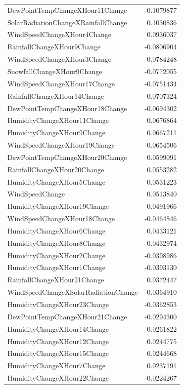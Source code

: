 \documentclass[
  letterpaper,
  DIV=11,
  numbers=noendperiod]{scrartcl}
\begin{document}
\begin{longtable}[]{@{}lr@{}}
DewPointTempChangeXHour11Change & -0.1079877 \\
SolarRadiationChangeXRainfallChange & 0.1030836 \\
WindSpeedChangeXHour4Change & 0.0936037 \\
RainfallChangeXHour9Change & -0.0806904 \\
WindSpeedChangeXHour3Change & 0.0784248 \\
SnowfallChangeXHour9Change & -0.0772055 \\
WindSpeedChangeXHour17Change & -0.0751434 \\
RainfallChangeXHour14Change & 0.0707324 \\
DewPointTempChangeXHour18Change & -0.0694302 \\
HumidityChangeXHour11Change & 0.0676864 \\
HumidityChangeXHour9Change & 0.0667211 \\
WindSpeedChangeXHour19Change & -0.0654506 \\
DewPointTempChangeXHour20Change & 0.0599091 \\
RainfallChangeXHour20Change & 0.0553282 \\
HumidityChangeXHour5Change & 0.0531223 \\
WindSpeedChange & 0.0513840 \\
HumidityChangeXHour19Change & 0.0491966 \\
WindSpeedChangeXHour18Change & -0.0464846 \\
HumidityChangeXHour6Change & 0.0433121 \\
HumidityChangeXHour8Change & 0.0432974 \\
HumidityChangeXHour2Change & -0.0398986 \\
HumidityChangeXHour1Change & -0.0393130 \\
RainfallChangeXHour21Change & 0.0372447 \\
WindSpeedChangeXSolarRadiationChange & 0.0364910 \\
HumidityChangeXHour23Change & -0.0362853 \\
DewPointTempChangeXHour21Change & -0.0294300 \\
HumidityChangeXHour14Change & 0.0261822 \\
HumidityChangeXHour12Change & 0.0244775 \\
HumidityChangeXHour15Change & 0.0244668 \\
HumidityChangeXHour7Change & 0.0237191 \\
HumidityChangeXHour22Change & -0.0224267 \\

\end{longtable}
\end{document}
